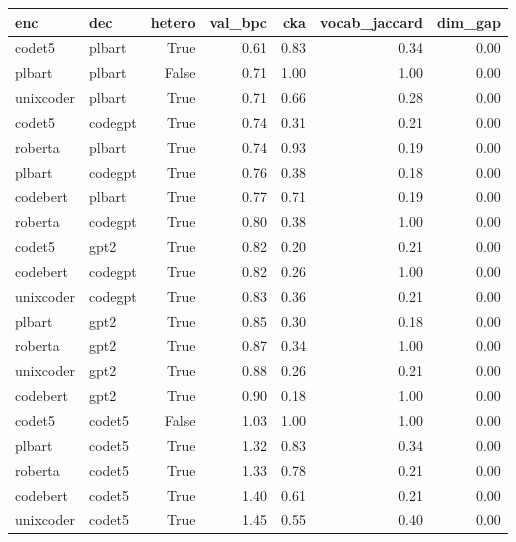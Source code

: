 \begin{tabular}{llrrrrr}
\toprule
enc & dec & hetero & val_bpc & cka & vocab_jaccard & dim_gap \\
\midrule
codet5 & plbart & True & 0.61 & 0.83 & 0.34 & 0.00 \\
plbart & plbart & False & 0.71 & 1.00 & 1.00 & 0.00 \\
unixcoder & plbart & True & 0.71 & 0.66 & 0.28 & 0.00 \\
codet5 & codegpt & True & 0.74 & 0.31 & 0.21 & 0.00 \\
roberta & plbart & True & 0.74 & 0.93 & 0.19 & 0.00 \\
plbart & codegpt & True & 0.76 & 0.38 & 0.18 & 0.00 \\
codebert & plbart & True & 0.77 & 0.71 & 0.19 & 0.00 \\
roberta & codegpt & True & 0.80 & 0.38 & 1.00 & 0.00 \\
codet5 & gpt2 & True & 0.82 & 0.20 & 0.21 & 0.00 \\
codebert & codegpt & True & 0.82 & 0.26 & 1.00 & 0.00 \\
unixcoder & codegpt & True & 0.83 & 0.36 & 0.21 & 0.00 \\
plbart & gpt2 & True & 0.85 & 0.30 & 0.18 & 0.00 \\
roberta & gpt2 & True & 0.87 & 0.34 & 1.00 & 0.00 \\
unixcoder & gpt2 & True & 0.88 & 0.26 & 0.21 & 0.00 \\
codebert & gpt2 & True & 0.90 & 0.18 & 1.00 & 0.00 \\
codet5 & codet5 & False & 1.03 & 1.00 & 1.00 & 0.00 \\
plbart & codet5 & True & 1.32 & 0.83 & 0.34 & 0.00 \\
roberta & codet5 & True & 1.33 & 0.78 & 0.21 & 0.00 \\
codebert & codet5 & True & 1.40 & 0.61 & 0.21 & 0.00 \\
unixcoder & codet5 & True & 1.45 & 0.55 & 0.40 & 0.00 \\
\bottomrule
\end{tabular}
